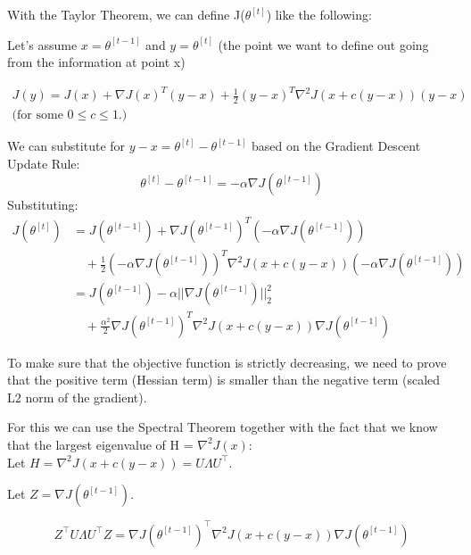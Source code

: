 \begin{answer}

With the Taylor Theorem, we can define J($\theta^{[t]}$) like the following:

Let's assume $x = \theta^{[t-1]}$ and $y = \theta^{[t]}$ (the point we want to define out going from the information at point x)

\begin{equation}
    \begin{aligned}
        J(y) = J(x) + \nabla J(x)^T(y-x) + \frac{1}{2}(y-x)^T \nabla^2 J(x+c(y-x))(y-x) \\
        \text{(for some $0 \le c \le 1$.)}
    \end{aligned}
\end{equation}

We can substitute for $y-x = \theta^{[t]} - \theta^{[t-1]}$ based on the Gradient Descent Update Rule:
\begin{equation}
\theta^{[t]} - \theta^{[t-1]} = -\alpha \nabla J(\theta^{[t-1]})
\end{equation}
Substituting:
\begin{align}
J(\theta^{[t]}) &= J(\theta^{[t-1]}) + \nabla J(\theta^{[t-1]})^T (-\alpha \nabla J(\theta^{[t-1]})) \nonumber \\
& \quad + \frac{1}{2} (-\alpha \nabla J(\theta^{[t-1]}))^T \nabla^2 J(x+c(y-x)) (-\alpha \nabla J(\theta^{[t-1]})) \nonumber \\
&= J(\theta^{[t-1]}) - \alpha ||\nabla J(\theta^{[t-1]})||_2^2 \nonumber \\
& \quad + \frac{\alpha^2}{2} \nabla J(\theta^{[t-1]})^T \nabla^2 J(x+c(y-x)) \nabla J(\theta^{[t-1]})
\end{align}

\smallskip
To make sure that the objective function is strictly decreasing, we need to prove that the positive term (Hessian term) is smaller than the negative term (scaled L2 norm of the gradient).

For this we can use the Spectral Theorem together with the fact that we know that the largest eigenvalue of H = $\nabla^2 J(x)$:
\smallskip \\

Let $H = \nabla^2 J(x+c(y-x)) = U \Lambda U^\top$.

Let $Z = \nabla J(\theta^{[t-1]})$.

\[
Z^\top U \Lambda U^\top Z = \nabla J(\theta^{[t-1]})^\top \nabla^2 J(x+c(y-x)) \nabla J(\theta^{[t-1]})
\]


\end{answer}
